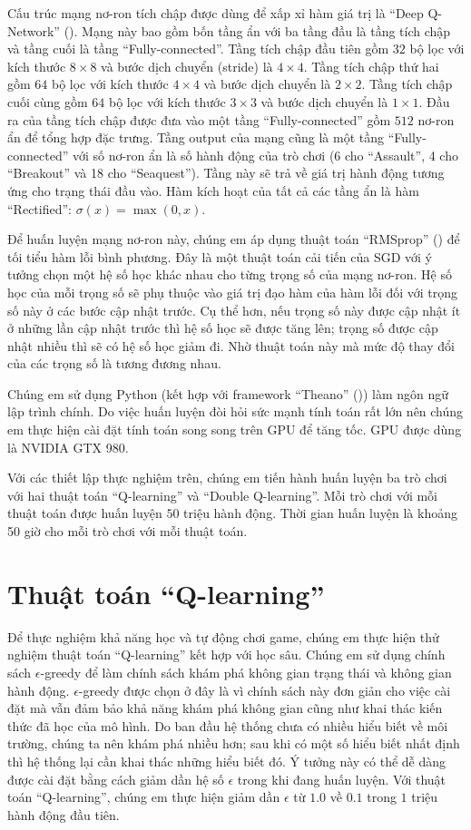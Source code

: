 	Cấu trúc mạng nơ-ron tích chập được dùng để xấp xỉ hàm giá trị là ``Deep Q-Network'' (\cite{mnihdqn2015}).
	Mạng này bao gồm bốn tầng ẩn với ba tầng đầu là tầng tích chập và tầng cuối là tầng ``Fully-connected''.
	Tầng tích chập đầu tiên gồm $32$ bộ lọc với kích thước $8\times8$ và bước dịch chuyển (stride) là $4\times4$.
	Tầng tích chập thứ hai gồm $64$ bộ lọc với kích thước $4\times4$ và bước dịch chuyển là $2\times2$.
	Tầng tích chập cuối cùng gồm $64$ bộ lọc với kích thước $3\times3$ và bước dịch chuyển là $1\times1$.
	Đầu ra của tầng tích chập được đưa vào một tầng ``Fully-connected'' gồm $512$ nơ-ron ẩn để tổng hợp đặc trưng.
	Tầng output của mạng cũng là một tầng ``Fully-connected'' với số nơ-ron ẩn là số hành động của trò chơi (6 cho ``Assault'', 4 cho ``Breakout'' và 18 cho ``Seaquest'').
	Tầng này sẽ trả về giá trị hành động tương ứng cho trạng thái đầu vào.
	Hàm kích hoạt của tất cả các tầng ẩn là hàm ``Rectified'': $\sigma(x) = \max(0, x)$.
	
	Để huấn luyện mạng nơ-ron này, chúng em áp dụng thuật toán ``RMSprop'' (\cite{tieleman2012lecture}) để tối tiểu hàm lỗi bình phương.
	Đây là một thuật toán cải tiến của SGD với ý tưởng chọn một hệ số học khác nhau cho từng trọng số của mạng nơ-ron.
	Hệ số học của mỗi trọng số sẽ phụ thuộc vào giá trị đạo hàm của hàm lỗi đối với trọng số này ở các bước cập nhật trước.
	Cụ thể hơn, nếu trọng số này được cập nhật ít ở những lần cập nhật trước thì hệ số học sẽ được tăng lên; trọng số được cập nhật nhiều thì sẽ có hệ số học giảm đi.
	Nhờ thuật toán này mà mức độ thay đổi của các trọng số là tương đương nhau.
	
	Chúng em sử dụng Python (kết hợp với framework ``Theano'' (\cite{2016arXiv160502688short})) làm ngôn ngữ lập trình chính.
	Do việc huấn luyện đòi hỏi sức mạnh tính toán rất lớn nên chúng em thực hiện cài đặt tính toán song song trên GPU để tăng tốc.
	GPU được dùng là NVIDIA GTX 980.
	
	Với các thiết lập thực nghiệm trên, chúng em tiến hành huấn luyện ba trò chơi với hai thuật toán ``Q-learning'' và ``Double Q-learning''.
	Mỗi trò chơi với mỗi thuật toán được huấn luyện $50$ triệu hành động.
	Thời gian huấn luyện là khoảng 50 giờ cho mỗi trò chơi với mỗi thuật toán.
	
\section{Thuật toán ``Q-learning''}
	Để thực nghiệm khả năng học và tự động chơi game, chúng em thực hiện thử nghiệm thuật toán ``Q-learning'' kết hợp với học sâu.
	Chúng em sử dụng chính sách $\epsilon$-greedy để làm chính sách khám phá không gian trạng thái và không gian hành động.
	$\epsilon$-greedy được chọn ở đây là vì chính sách này đơn giản cho việc cài đặt mà vẫn đảm bảo khả năng khám phá không gian cũng như khai thác kiến thức đã học của mô hình.
	Do ban đầu hệ thống chưa có nhiều hiểu biết về môi trường, chúng ta nên khám phá nhiều hơn; sau khi có một số hiểu biết nhất định thì hệ thống lại cần khai thác những hiểu biết đó.
	Ý tưởng này có thể dễ dàng được cài đặt bằng cách giảm dần hệ số $\epsilon$ trong khi đang huấn luyện.
	Với thuật toán ``Q-learning'', chúng em thực hiện giảm dần $\epsilon$ từ $1.0$ về $0.1$ trong $1$ triệu hành động đầu tiên.
	
